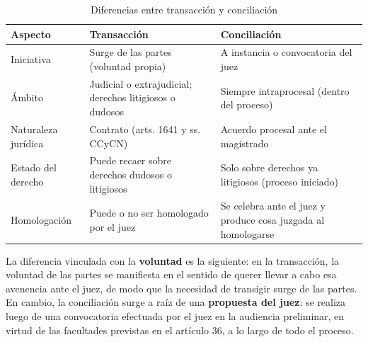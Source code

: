 \documentclass[12pt,oneside]{book}
\begin{document}
\begin{table}[H]
\centering
\caption{Diferencias entre transacción y conciliación}
\small
\begin{tabularx}{\textwidth}{
    >{\raggedright\arraybackslash}p{}
    >{\raggedright\arraybackslash}X
    >{\raggedright\arraybackslash}X
}
\toprule
\textbf{Aspecto} & \textbf{Transacción} & \textbf{Conciliación} \\
\midrule
Iniciativa & Surge de las partes (voluntad propia) & A instancia o convocatoria del juez \\
Ámbito & Judicial o extrajudicial; derechos litigiosos o dudosos & Siempre intraprocesal (dentro del proceso) \\
Naturaleza jurídica & Contrato (arts. 1641 y ss. CCyCN) & Acuerdo procesal ante el magistrado \\
Estado del derecho & Puede recaer sobre derechos dudosos o litigiosos & Solo sobre derechos ya litigiosos (proceso iniciado) \\
Homologación & Puede o no ser homologado por el juez & Se celebra ante el juez y produce cosa juzgada al homologarse \\
\bottomrule
\end{tabularx}
\end{table}

La diferencia vinculada con la \textbf{voluntad} es la siguiente: en la transacción, la voluntad de las partes se manifiesta en el sentido de querer llevar a cabo esa avenencia ante el juez, de modo que la necesidad de transigir surge de las partes. En cambio, la conciliación surge a raíz de una \textbf{propuesta del juez}: se realiza luego de una convocatoria efectuada por el juez en la audiencia preliminar, en virtud de las facultades previstas en el artículo 36, a lo largo de todo el proceso.

\end{document}
